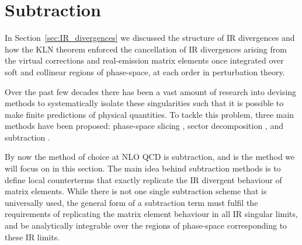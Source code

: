 \documentclass[main.tex]{subfiles}
\begin{document}
\section{Subtraction}\label{sec:subtraction}
    In Section~\ref{sec:IR_divergences} we discussed the
    structure of IR divergences and how the KLN theorem
    enforced the cancellation of IR divergences 
    arising from the virtual corrections and real-emission
    matrix elements once integrated over soft and collinear
    regions of phase-space, at each order in perturbation
    theory.

    Over the past few decades there has been a vast
    amount of research into devising methods to systematically
    isolate these singularities such that it is possible
    to make finite predictions of physical quantities.
    To tackle this problem, three
    main methods have been proposed: phase-space slicing \cite{Fabricius:1981sx,Kramer:1986mc,Giele:1991vf},
    sector decomposition \cite{Binoth:2000ps,Binoth:2003ak}, and subtraction \cite{Ellis:1980nc}.
    
    By now the method of choice at NLO QCD is subtraction,
    and is the method we will focus on in this section. The main
    idea behind subtraction methods is to define local counterterms
    that exactly replicate the IR divergent behaviour of matrix
    elements. While there is not one single subtraction scheme
    that is universally used, the general form of a subtraction term
    must fulfil the requirements of replicating the matrix element
    behaviour in all IR singular limits, and be analytically integrable
    over the regions of phase-space corresponding to these IR limits.
\end{document}
